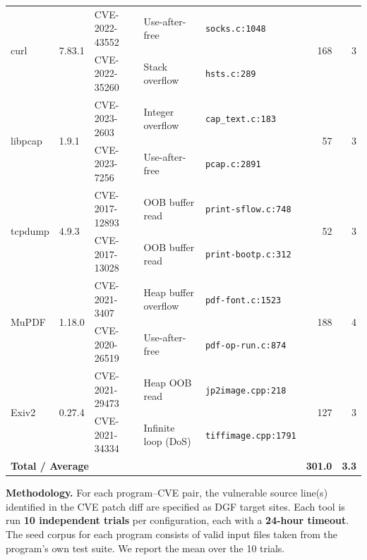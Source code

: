 \documentclass[preprint,12pt,3p]{elsarticle}
\begin{document}
\begin{table}[t]
\begin{tabular}{llp{2.5cm}p{3.2cm}p{4.2cm}rr}
\multirow{2}{*}{curl}    & \multirow{2}{*}{7.83.1}
  & CVE-2022-43552 & Use-after-free
  & \texttt{socks.c:1048}
  & \multirow{2}{*}{168}  & \multirow{2}{*}{3} \\
  &  & CVE-2022-35260 & Stack overflow
  & \texttt{hsts.c:289}
  &                       &                    \\[2pt]
\multirow{2}{*}{libpcap} & \multirow{2}{*}{1.9.1}
  & CVE-2023-2603  & Integer overflow
  & \texttt{cap\_text.c:183}
  & \multirow{2}{*}{57}   & \multirow{2}{*}{3} \\
  &  & CVE-2023-7256  & Use-after-free
  & \texttt{pcap.c:2891}
  &                       &                    \\[2pt]
\multirow{2}{*}{tcpdump} & \multirow{2}{*}{4.9.3}
  & CVE-2017-12893 & OOB buffer read
  & \texttt{print-sflow.c:748}
  & \multirow{2}{*}{52}   & \multirow{2}{*}{3} \\
  &  & CVE-2017-13028 & OOB buffer read
  & \texttt{print-bootp.c:312}
  &                       &                    \\[2pt]
\multirow{2}{*}{MuPDF}   & \multirow{2}{*}{1.18.0}
  & CVE-2021-3407  & Heap buffer overflow
  & \texttt{pdf-font.c:1523}
  & \multirow{2}{*}{188}  & \multirow{2}{*}{4} \\
  &  & CVE-2020-26519 & Use-after-free
  & \texttt{pdf-op-run.c:874}
  &                       &                    \\[2pt]
\multirow{2}{*}{Exiv2}   & \multirow{2}{*}{0.27.4}
  & CVE-2021-29473 & Heap OOB read
  & \texttt{jp2image.cpp:218}
  & \multirow{2}{*}{127}  & \multirow{2}{*}{3} \\
  &  & CVE-2021-34334 & Infinite loop (DoS)
  & \texttt{tiffimage.cpp:1791}
  &                       &                    \\
\midrule
\multicolumn{5}{l}{\textbf{Total / Average}} & \textbf{301.0} & \textbf{3.3} \\
\bottomrule
\end{tabular}
\end{table}

\textbf{Methodology.}  For each program--CVE pair, the vulnerable source
line(s) identified in the CVE patch diff are specified as DGF target sites.
Each tool is run \textbf{10 independent trials} per configuration, each with
a \textbf{24-hour timeout}.  The seed corpus for each program consists of
valid input files taken from the program's own test suite.  We report the
mean over the 10 trials.
\end{document}
